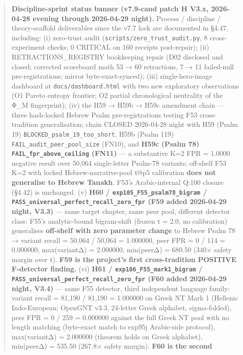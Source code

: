 \documentclass[
]{article}
\begin{document}
\begin{quote}
\textbf{Discipline-sprint status banner (v7.9-cand patch H V3.x,
2026-04-28 evening through 2026-04-29 night).} Process / discipline /
theory-scaffold deliverables since the v7.7 lock are documented in
§4.47, including: (i) zero-trust audit
(\texttt{scripts/zero\_trust\_audit.py}, 8 cross-experiment checks; 0
CRITICAL on 160 receipts post-repair); (ii) RETRACTIONS\_REGISTRY
bookkeeping repair (D02 disclosed and closed; corrected scoreboard math
53 → 60 retractions, 7 → 11 failed-null pre-registrations; mirror
byte-exact-synced); (iii) single-hero-image dashboard at
\texttt{docs/dashboard.html} with two new exploratory observations (O1
Pareto entropy frontier; O2 partial chronological neutrality of the Φ\_M
fingerprint); (iv) the H59 → H59b → H59c amendment chain --- three
hash-locked Hebrew Psalm pre-registrations testing F53 cross-tradition
generalisation; chain CLOSED 2026-04-28 night with H59 (Psalm 19)
\texttt{BLOCKED\_psalm\_19\_too\_short}, H59b (Psalm 119)
\texttt{FAIL\_audit\_peer\_pool\_size} (FN10), and \textbf{H59c (Psalm
78) \texttt{FAIL\_fpr\_above\_ceiling} (FN11)} --- a substantive K=2 FPR
= 1.0000 negative result over 50,064 single-letter Psalm-78 variants;
off-shelf F53 K=2 with locked Hebrew-narrative-pool τ@p5 calibration
\textbf{does not generalise to Hebrew Tanakh}. F53's Arabic-internal
Q:100 closure (§4.42) is unchanged. (v) \textbf{H60 /
\texttt{exp105\_F55\_psalm78\_bigram} /
\texttt{PASS\_universal\_perfect\_recall\_zero\_fpr} (F59 added
2026-04-29 night, V3.3)} --- same target chapter, same peer pool,
different detector class: F55's analytic-bound bigram-shift (frozen τ =
2.0, no calibration) generalises \textbf{off-shelf with zero parameter
change} to Hebrew Psalm 78 → variant recall = 50,064 / 50,064 =
1.000000, peer FPR = 0 / 114 = 0.000000, max(variantΔ) = 2.000000,
min(peerΔ) = 680.50 (340× safety margin over τ). \textbf{F59 is the
project's first cross-tradition POSITIVE F-detector finding.} (vi)
\textbf{H61 / \texttt{exp106\_F55\_mark1\_bigram} /
\texttt{PASS\_universal\_perfect\_recall\_zero\_fpr} (F60 added
2026-04-29 night, V3.4)} --- same F55 detector, third independent
language family: variant recall = 81,190 / 81,190 = 1.000000 on Greek NT
Mark 1 (Hellenic Indo-European; OpenGNT v3.3, 24-letter Greek alphabet,
sigma-folded), peer FPR = 0 / 259 = 0.000000 against the full Greek NT
pool with no length matching (byte-exact match to exp95j Arabic-side
protocol), max(variantΔ) = 2.000000 (theorem holds on Greek alphabet),
min(peerΔ) = 535.50 (267.8× safety margin). \textbf{F60 is the second
}
\end{quote}
\end{document}
